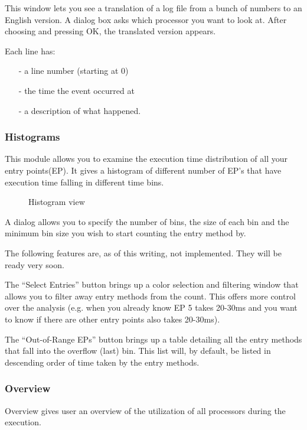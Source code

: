 \documentclass[10pt,dvips]{article}
\begin{document}
This window lets you see a translation of a log file from a bunch of
numbers to an English version.  A dialog box asks which processor you
want to look at.  After choosing and pressing OK, the translated
version appears.

Each line has:
\begin{itemize}
\item[-] a line number (starting at 0)
\item[-] the time the event occurred at
\item[-] a description of what happened.
\end{itemize}

\subsubsection{Histograms}

This module allows you to examine the execution time distribution of all your
entry points(EP). It gives a histogram of different number of EP's that have
execution time falling in different time bins.

\begin{figure}[htb]
\center
{}
\caption{Histogram view}
\label{histogram}
\end{figure}

A dialog allows you to specify the number of bins, the size of each
bin and the minimum bin size you wish to start counting the entry
method by.

The following features are, as of this writing, not implemented. They
will be ready very soon.

The ``Select Entries'' button brings up a color selection and
filtering window that allows you to filter away entry methods from the
count. This offers more control over the analysis (e.g. when you
already know EP 5 takes 20-30ms and you want to know if there
are other entry points also takes 20-30ms).

The ``Out-of-Range EPs'' button brings up a table detailing all the
entry methods that fall into the overflow (last) bin. This list will,
by default, be listed in descending order of time taken by the entry
methods.

\subsubsection{Overview}

Overview gives user an overview of the utilization of all processors
during the execution. 
\end{document}
